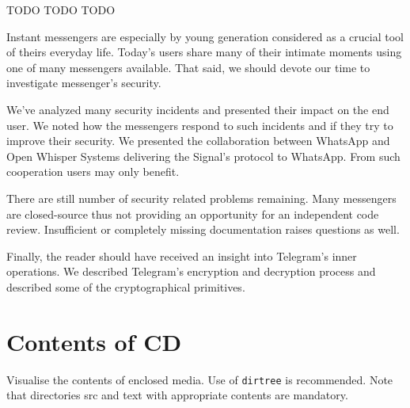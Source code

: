 \documentclass[thesis=M,english]{FITthesis}[2012/10/20]
\begin{document}
\begin{conclusion}

TODO TODO TODO

Instant messengers are especially by young generation considered as a crucial tool of theirs everyday life. Today's users share many of their intimate moments using one of many messengers available. That said, we should devote our time to investigate messenger's security.

We've analyzed many security incidents and presented their impact on the end user. We noted how the messengers respond to such incidents and if they try to improve their security. We presented the collaboration between WhatsApp and Open Whisper Systems delivering the Signal's protocol to WhatsApp. From such cooperation users may only benefit.

There are still number of security related problems remaining. Many messengers are closed-source thus not providing an opportunity for an independent code review. Insufficient or completely missing documentation raises questions as well.

Finally, the reader should have received an insight into Telegram's inner operations. We described Telegram's encryption and decryption process and described some of the cryptographical primitives.

\end{conclusion}





\appendix


\chapter{Contents of CD}\label{app:CDcontent}

Visualise the contents of enclosed media. Use of \verb|dirtree| is recommended. Note that directories src and text with appropriate contents are mandatory.


\begin{figure}
\end{figure}
\end{document}
